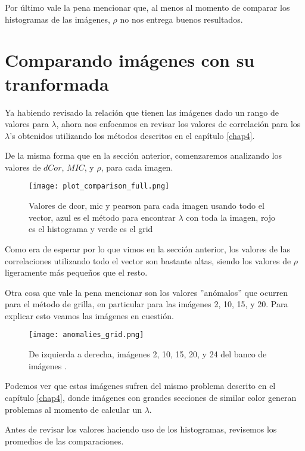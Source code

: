         Por \'ultimo vale la pena mencionar que, al menos al momento de comparar los histogramas de las im\'agenes, $\rho$ no nos entrega buenos resultados. 


\section{Comparando im\'agenes con su tranformada}

    Ya habiendo revisado la relaci\'on que tienen las im\'agenes dado un rango de valores para $\lambda$, ahora nos enfocamos en revisar los valores de correlaci\'on para los $\lambda$'s obtenidos utilizando los m\'etodos descritos en el cap\'itulo \ref{chap4}. 
    
    De la misma forma que en la secci\'on anterior, comenzaremos analizando los valores de $dCor$, $MIC$, y $\rho$, para cada imagen.
    
    \begin{figure}[H]
        \centering
        \texttt{[image: plot\_comparison\_full.png]}
        \caption{Valores de dcor, mic y pearson para cada imagen usando todo el vector, azul es el m\'etodo para encontrar $\lambda$ con toda la imagen, rojo es el histograma y verde es el grid}
    \end{figure}

    Como era de esperar por lo que vimos en la secci\'on anterior, los valores de las correlaciones utilizando todo el vector son bastante altas, siendo los valores de $\rho$ ligeramente m\'as peque\~nos que el resto. 

    Otra cosa que vale la pena mencionar son los valores ''an\'omalos'' que ocurren para el m\'etodo de grilla, en particular para las im\'agenes 2, 10, 15, y 20. Para explicar esto veamos las im\'agenes en cuesti\'on.

    \begin{figure}[H]
        \centering
        \texttt{[image: anomalies\_grid.png]}
        \caption{De izquierda a derecha, im\'agenes 2, 10, 15, 20, y 24 del banco de im\'agenes \cite{KodakLosslessTrueColorImageSuite}.}
    \end{figure}

    Podemos ver que estas im\'agenes sufren del mismo problema descrito en el cap\'itulo \ref{chap4}, donde im\'agenes con grandes secciones de similar color generan problemas al momento de calcular un $\lambda$.

    Antes de revisar los valores haciendo uso de los histogramas, revisemos los promedios de las comparaciones. 

